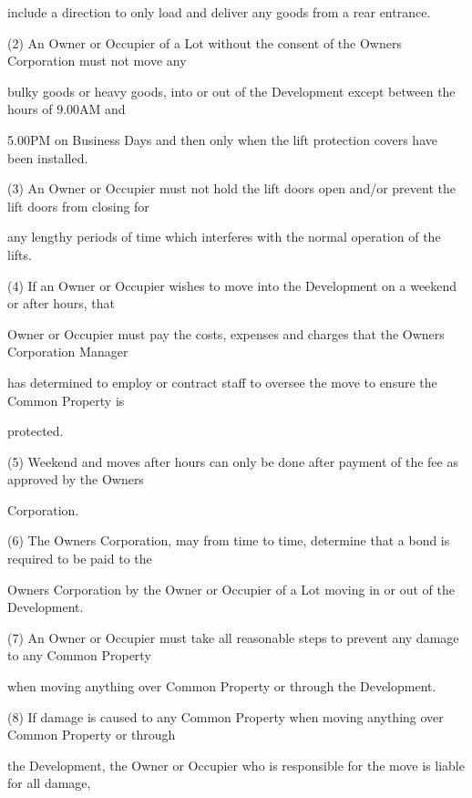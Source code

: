 \documentclass{article}
\begin{document}
{\fontsize{10.02}{1}include a direction to only load and deliver any goods from a rear entrance. }

{\fontsize{9.962}{1}(2) An Owner or Occupier of a Lot without the consent of the Owners Corporation must not move any }

{\fontsize{10.02}{1}bulky goods or heavy goods, into or out of the Development except between the hours of 9.00AM and }

{\fontsize{10.02}{1}5.00PM on Business Days and then only when the lift protection covers have been installed. }

{\fontsize{9.962}{1}(3) An Owner or Occupier must not hold the lift doors open and/or prevent the lift doors from closing for }

{\fontsize{10.02}{1}any lengthy periods of time which interferes with the normal operation of the lifts. }

{\fontsize{9.962}{1}(4) If an Owner or Occupier wishes to move into the Development on a weekend or after hours, that }

{\fontsize{10.02}{1}Owner or Occupier must pay the costs, expenses and charges that the Owners Corporation Manager }

{\fontsize{10.02}{1}has determined to employ or contract staff to oversee the move to ensure the Common Property is }

{\fontsize{10.02}{1}protected. }

{\fontsize{9.962}{1}(5) Weekend and moves after hours can only be done after payment of the fee as approved by the Owners }

{\fontsize{10.02}{1}Corporation. }

{\fontsize{9.962}{1}(6) The Owners Corporation, may from time to time, determine that a bond is required to be paid to the }

{\fontsize{10.02}{1}Owners Corporation by the Owner or Occupier of a Lot moving in or out of the Development. }

{\fontsize{9.962}{1}(7) An Owner or Occupier must take all reasonable steps to prevent any damage to any Common Property }

{\fontsize{10.02}{1}when moving anything over Common Property or through the Development. }

{\fontsize{9.962}{1}(8) If damage is caused to any Common Property when moving anything over Common Property or through }

{\fontsize{10.02}{1}the Development, the Owner or Occupier who is responsible for the move is liable for all damage, }
\end{document}
